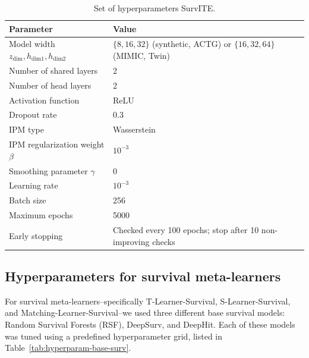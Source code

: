 \documentclass{article} %
\begin{document}
\begin{table}[htbp]
\centering
\footnotesize
\setlength{\tabcolsep}{4pt}
\caption{Set of hyperparameters SurvITE.}
\label{tab:hyperparam-survite}
\begin{tabular}{l l}
\toprule
\textbf{Parameter} & \textbf{Value} \\ 
\midrule
Model width $z_{\text{dim}}, h_{\text{dim1}}, h_{\text{dim2}}$
& $\{8,16,32\}$ (synthetic, ACTG) or $\{16,32,64\}$ (MIMIC, Twin) \\
Number of shared layers & 2 \\
Number of head layers & 2 \\
Activation function & ReLU \\
Dropout rate & 0.3 \\
IPM type & Wasserstein \\
IPM regularization weight $\beta$ & $10^{-3}$ \\
Smoothing parameter $\gamma$ & 0 \\
Learning rate & $10^{-3}$ \\
Batch size & 256 \\
Maximum epochs & 5000 \\
Early stopping & Checked every 100 epochs; stop after 10 non-improving checks \\
\bottomrule
\end{tabular}
\end{table}

\clearpage
\vspace{0.2cm}
\subsection{Hyperparameters for survival meta-learners}

For survival meta-learners--specifically T-Learner-Survival, S-Learner-Survival, and Matching-Learner-Survival--we used three different base survival models: Random Survival Forests (RSF), DeepSurv, and DeepHit. Each of these models was tuned using a predefined hyperparameter grid, listed in Table~\ref{tab:hyperparam-base-surv}.
\end{document}

